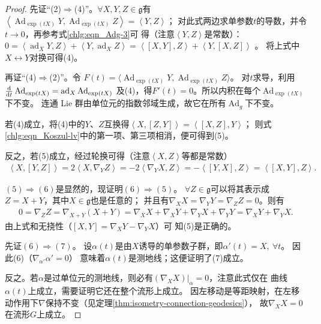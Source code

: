 \begin{proof}
    先证“(2)$\Rightarrow$(4)”。$\forall X,Y,Z\in \mathfrak{g}$有
    $\left<\operatorname{Ad}_{\exp(tX)}Y,\operatorname{Ad}_{\exp(tX)}Z\right>=\left<Y,Z\right>$；
    对此式两边求单参数$t$的导数，并令$t\to 0$，再参考式\eqref{chlg:eqn_Adg-3}可
    得（注意$\left<Y,Z\right>$是常数）：
    $ 0= \left<\operatorname{ad}_{X}Y,Z\right>+\left<Y,\operatorname{ad}_X Z\right>
    =\left<[X,Y],Z\right> + \left<Y,[X,Z]\right> $ 。
    将上式中$X\leftrightarrow Y$对换可得(4)。

    再证“(4)$\Rightarrow$(2)”。令
    $F(t)=\langle\operatorname{Ad}_{\exp(tX)}Y,\operatorname{Ad}_{\exp(tX)}Z\rangle$。
    对$t$求导，利用$\frac{\dd}{\dd t}\operatorname{Ad}_{\exp(tX)}=\operatorname{ad}_X\operatorname{Ad}_{\exp(tX)}$
    及(4)，得$F'(t)=0$。所以内积在每个$\operatorname{Ad}_{\exp(tX)}$下不变。
    连通 Lie 群由单位元的指数邻域生成，故它在所有$\operatorname{Ad}_g$下不变。

    若(4)成立，将(4)中的$Y$、$Z$互换得$\left<X,[Z,Y]\right>=\left<[X,Z],Y\right>$；
    则式\eqref{chlg:eqn_Koszul-lv}中的第一项、第三项相消，便可得到(5)。

    反之，若(5)成立，经过轮换可得（注意$\left< X,Z\right>$等都是常数）
    \begin{align*}
        \left< X,[Y,Z]\right> = 2 \left<X, \nabla_Y Z \right>
        =- 2 \left<\nabla_Y X, Z \right>
        =- \left< [Y,X], Z \right> = \left< [X,Y], Z \right> .
    \end{align*}

    $(5)\Rightarrow (6)$是显然的，现证明$(6)\Rightarrow (5)$。
    $\forall Z\in \mathfrak{g}$可以将其表示成$Z=X+Y$，其中$X\in \mathfrak{g}$也是任意的；
    并且有$\nabla_X X =\nabla_Y Y =\nabla_Z Z =0$。则有
    \begin{align*}
        0=\nabla_Z Z =\nabla_{X+Y}(X+Y)= \nabla_X X+\nabla_X Y+\nabla_Y X+\nabla_Y Y
        =\nabla_X Y+\nabla_Y X .
    \end{align*}
    由上式和无挠性（$\left[ {X,Y} \right] = \nabla_X Y - \nabla_Y X$）可
    知(5)是正确的。

    先证$(6)\Rightarrow (7)$。
    设$\alpha(t)$是由$X$诱导的单参数子群，即$\alpha'(t)=X,\ \forall t$。
    因此(6)（$\nabla_{\alpha'} \alpha'=0$）
    意味着$\alpha(t)$是测地线；这便证明了(7)成立。

    反之。若$\alpha$是过单位元的测地线，则必有$(\nabla_X X)|_{\alpha}=0$，注意此式仅在
    曲线$\alpha(t)$上成立，需要证明它还在整个流形上成立。
    因左移动是等距映射，在左移动作用下$\nabla$保持不变（见定理\ref{thm:isometry-connection-geodesics}），
    故$\nabla_X X=0$在流形$G$上成立。
\end{proof}

